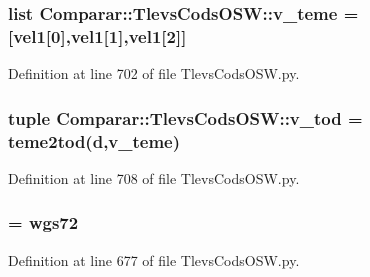 \subsubsection[{v\-\_\-teme}]{\setlength{\rightskip}{0pt plus 5cm}list {\bf \-Comparar\-::\-Tlevs\-Cods\-O\-S\-W\-::v\-\_\-teme} = [vel1[0],vel1[1],vel1[2]]}\label{namespace_comparar_1_1_tlevs_cods_o_s_w_af56ebdde98c2102a1cda5e1d0fcade44}


\-Definition at line 702 of file \-Tlevs\-Cods\-O\-S\-W.\-py.

\subsubsection[{v\-\_\-tod}]{\setlength{\rightskip}{0pt plus 5cm}tuple {\bf \-Comparar\-::\-Tlevs\-Cods\-O\-S\-W\-::v\-\_\-tod} = teme2tod({\bf d},{\bf v\-\_\-teme})}\label{namespace_comparar_1_1_tlevs_cods_o_s_w_a67fcf7e0e6ea8441d0bfa8f52c7f99a6}


\-Definition at line 708 of file \-Tlevs\-Cods\-O\-S\-W.\-py.

\subsubsection[{whichconst}]{ = wgs72}\label{namespace_comparar_1_1_tlevs_cods_o_s_w_a2f263feac66e6a83750b5d6eeebc4141}


\-Definition at line 677 of file \-Tlevs\-Cods\-O\-S\-W.\-py.

